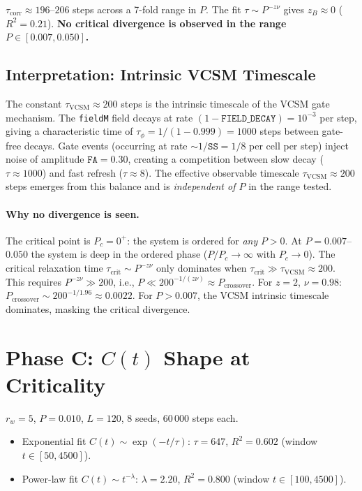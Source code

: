 \documentclass[11pt,a4paper]{article}
\begin{document}
$\tau_\mathrm{corr}\approx196$--$206$ steps across a 7-fold range in $P$.
The fit $\tau\sim P^{-z\nu}$ gives $z_B\approx0$ ($R^2=0.21$).
\textbf{No critical divergence is observed in the range $P\in[0.007,0.050]$.}

\subsection{Interpretation: Intrinsic VCSM Timescale}

The constant $\tau_\mathrm{VCSM}\approx200$ steps is the intrinsic timescale of the
VCSM gate mechanism.  The \texttt{fieldM} field decays at rate
$(1-\texttt{FIELD\_DECAY})=10^{-3}$ per step, giving a characteristic time of
$\tau_\phi=1/(1-0.999)=1000$ steps between gate-free decays.
Gate events (occurring at rate $\sim1/\texttt{SS}=1/8$ per cell per step) inject
noise of amplitude $\texttt{FA}=0.30$, creating a competition between slow decay
($\tau\approx1000$) and fast refresh ($\tau\approx8$).
The effective observable timescale $\tau_\mathrm{VCSM}\approx200$ steps emerges
from this balance and is \emph{independent of $P$} in the range tested.

\paragraph{Why no divergence is seen.}
The critical point is $P_c=0^+$: the system is ordered for \emph{any} $P>0$.
At $P=0.007$--$0.050$ the system is deep in the ordered phase
($P/P_c\to\infty$ with $P_c\to0$).  The critical relaxation time
$\tau_\mathrm{crit}\sim P^{-z\nu}$ only dominates when
$\tau_\mathrm{crit}\gg\tau_\mathrm{VCSM}\approx200$.
This requires $P^{-z\nu}\gg200$, i.e., $P\ll200^{-1/(z\nu)}\approx P_\mathrm{crossover}$.
For $z=2$, $\nu=0.98$: $P_\mathrm{crossover}\sim200^{-1/1.96}\approx0.0022$.
For $P>0.007$, the VCSM intrinsic timescale dominates, masking the critical divergence.

\section{Phase C: $C(t)$ Shape at Criticality}

$r_w{=}5$, $P{=}0.010$, $L{=}120$, 8 seeds, 60\,000 steps each.

\begin{itemize}
\item Exponential fit $C(t)\sim\exp(-t/\tau)$:
      $\tau=647$, $R^2=0.602$ (window $t\in[50,4500]$).
\item Power-law fit $C(t)\sim t^{-\lambda}$:
      $\lambda=2.20$, $R^2=0.800$ (window $t\in[100,4500]$).
\end{itemize}
\end{document}
